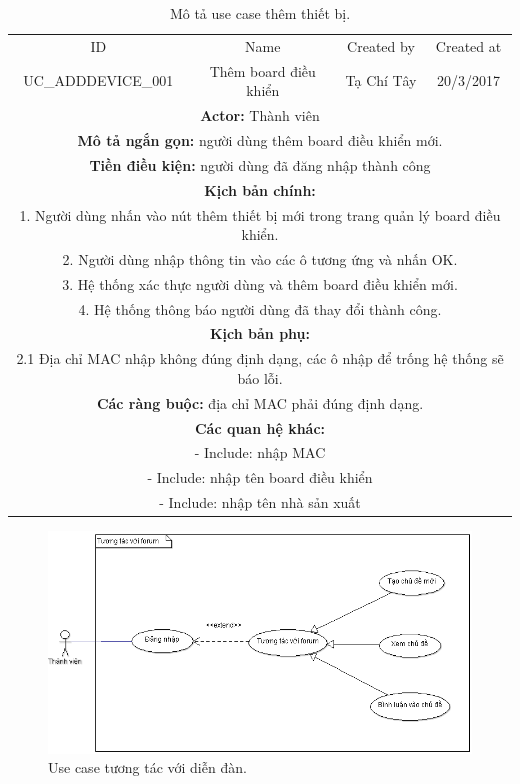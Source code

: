 \documentclass[a4paper,12pt,oneside]{article}
\begin{document}
\begin{table}[!htp]
\centering
\begin{tabularx}{\linewidth}{ |c||c|c|c| }
\hline
ID & Name & Created by & Created at\\
UC\_ADDDEVICE\_001 & Thêm board điều khiển & Tạ Chí Tây & 20/3/2017\\
\hline
\multicolumn{4}{|X|}{\textbf{Actor:} Thành viên }\\
\hline
\multicolumn{4}{|X|}{\textbf{Mô tả ngắn gọn:} người dùng thêm board điều khiển mới.}\\
\hline
\multicolumn{4}{|X|}{\textbf{Tiền điều kiện:} người dùng đã đăng nhập thành công}\\
\hline
\multicolumn{4}{|X|}{\textbf{Kịch bản chính:}}\\
\multicolumn{4}{|X|}{1. Người dùng nhấn vào nút thêm thiết bị mới trong trang quản lý board điều khiển.}\\
\multicolumn{4}{|X|}{
2.	Người dùng nhập thông tin vào các ô tương ứng và nhấn OK.}\\
\multicolumn{4}{|X|}{
3.	Hệ thống xác thực người dùng và thêm board điều khiển mới.}\\
\multicolumn{4}{|X|}{
4.	Hệ thống thông báo người dùng đã thay đổi thành công.}\\
\hline
\multicolumn{4}{|X|}{\textbf{Kịch bản phụ:}}\\
\multicolumn{4}{|X|}{2.1    Địa chỉ MAC nhập không đúng định dạng, các ô nhập để trống hệ thống sẽ báo lỗi.}\\
\hline
\multicolumn{4}{|X|}{\textbf{Các ràng buộc:} địa chỉ MAC phải đúng định dạng.}\\
\hline
\multicolumn{4}{|X|}{\textbf{Các quan hệ khác:}}\\
\multicolumn{4}{|X|}{- Include: nhập MAC}\\
\multicolumn{4}{|X|}{- Include: nhập tên board điều khiển}\\
\multicolumn{4}{|X|}{- Include: nhập tên nhà sản xuất}\\
\hline
\end{tabularx}
\caption{Mô tả use case thêm thiết bị.}
\end{table}

\begin{figure}[htp]
\centering
\includegraphics[scale=.8]{hinh/newthread.png}
\caption{Use case tương tác với diễn đàn.}
\end{figure}
\end{document}
